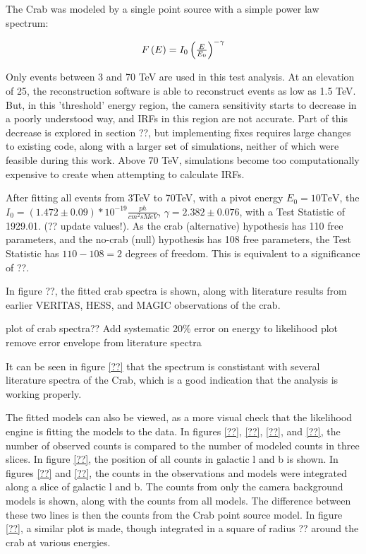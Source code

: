     The Crab was modeled by a single point source with a simple power law spectrum:

    \begin{equation} \label{eqn:powerlaw}
    $$  F\left( E \right) = I_{0} \left( \frac{E}{E_{0}} \right)^{-\gamma} $$
    \end{equation}

    Only events between 3 and 70 TeV are used in this test analysis.
    At an elevation of 25\degree, the reconstruction software is able to reconstruct events as low as 1.5 TeV.
    But, in this 'threshold' energy region, the camera sensitivity starts to decrease in a poorly understood way, and IRFs in this region are not accurate.
    Part of this decrease is explored in section ??, but implementing fixes requires large changes to existing code, along with a larger set of simulations, neither of which were feasible during this work.
    Above 70 TeV, simulations become too computationally expensive to create when attempting to calculate IRFs.
    
    After fitting all events from 3TeV to 70TeV, with a pivot energy $ E_{0}= 10\text{TeV} $, the $ I_{0} = \left(1.472\pm0.09\right)*10^{-19} \frac{ph}{cm^{2} s MeV} $, $ \gamma = 2.382 \pm 0.076 $, with a Test Statistic of 1929.01. (?? update values!).
    As the crab (alternative) hypothesis has 110 free parameters, and the no-crab (null) hypothesis has 108 free parameters, the Test Statistic has $ 110 - 108 = 2 $ degrees of freedom.
    This is equivalent to a significance of ??.
    
    In figure ??, the fitted crab spectra is shown, along with literature results from earlier VERITAS, HESS, and MAGIC observations of the crab.
    
    plot of crab spectra??
    Add systematic 20\% error on energy to likelihood plot
    remove error envelope from literature spectra
    
    It can be seen in figure \ref{??} that the spectrum is constistant with several literature spectra of the Crab, which is a good indication that the analysis is working properly.
    
    The fitted models can also be viewed, as a more visual check that the likelihood engine is fitting the models to the data.
    In figures \ref{??}, \ref{??}, \ref{??}, and \ref{??}, the number of observed counts is compared to the number of modeled counts in three slices.
    In figure \ref{??}, the position of all counts in galactic l and b is shown.
    In figures \ref{??} and \ref{??}, the counts in the observations and models were integrated along a slice of galactic l and b.
    The counts from only the camera background models is shown, along with the counts from all models.
    The difference between these two lines is then the counts from the Crab point source model.
    In figure \ref{??}, a similar plot is made, though integrated in a square of radius ?? around the crab at various energies.
    
